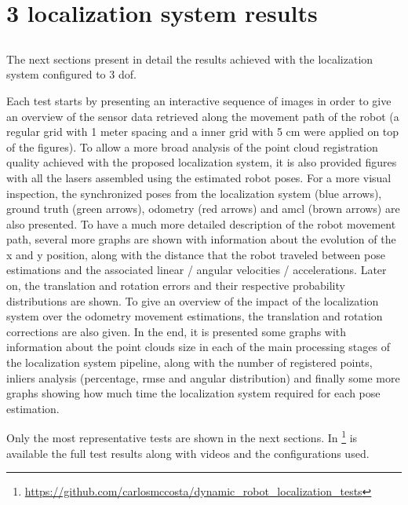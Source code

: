 \chapter{3  localization system results} \label{app:appendix-a}



\section*{}

The next sections present in detail the results achieved with the localization system configured to 3 \gls{dof}.

Each test starts by presenting an interactive sequence of images in order to give an overview of the sensor data retrieved along the movement path of the robot (a regular grid with 1 meter spacing and a inner grid with 5 cm were applied on top of the figures). To allow a more broad analysis of the point cloud registration quality achieved with the proposed localization system, it is also provided figures with all the lasers assembled using the estimated robot poses. For a more visual inspection, the synchronized poses from the localization system (blue arrows), ground truth (green arrows), odometry (red arrows) and \gls{amcl} (brown arrows) are also presented. To have a much more detailed description of the robot movement path, several more graphs are shown with information about the evolution of the x and y position, along with the distance that the robot traveled between pose estimations and the associated linear / angular velocities / accelerations. Later on, the translation and rotation errors and their respective probability distributions are shown. To give an overview of the impact of the localization system over the odometry movement estimations, the translation and rotation corrections are also given. In the end, it is presented some graphs with information about the point clouds size in each of the main processing stages of the localization system pipeline, along with the number of registered points, inliers analysis (percentage, \gls{rmse} and angular distribution) and finally some more graphs showing how much time the localization system required for each pose estimation.

Only the most representative tests are shown in the next sections. In \footnote{\url{https://github.com/carlosmccosta/dynamic_robot_localization_tests}} is available the full test results along with videos and the configurations used.


